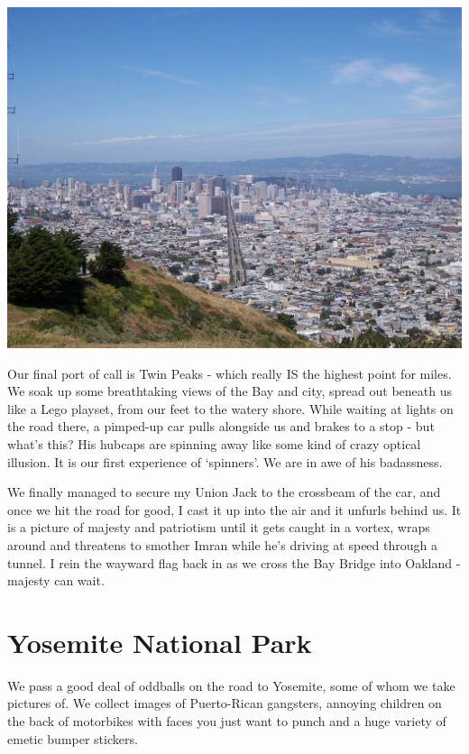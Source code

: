 \documentclass[a5paper,titlepage,11pt]{book}
\begin{document}
\begin{center}\includegraphics[width=\textwidth]{gfx/100_1168}\end{center}

Our final port of call is Twin Peaks - which really IS the highest point for miles. We soak up some breathtaking views of the Bay and city, spread out beneath us like a Lego playset, from our feet to the watery shore.  While waiting at lights on the road there, a pimped-up car pulls alongside us and brakes to a stop - but what's this?  His hubcaps are spinning away like some kind of crazy optical illusion.  It is our first experience of `spinners'.  We are in awe of his badassness.

We finally managed to secure my Union Jack to the crossbeam of the car, and once we hit the road for good, I cast it up into the air and it unfurls behind us.  It is a picture of majesty and patriotism until it gets caught in a vortex, wraps around and threatens to smother Imran while he's driving at speed through a tunnel.  I rein the wayward flag back in as we cross the Bay Bridge into Oakland - majesty can wait.

\section*{Yosemite National Park}
We pass a good deal of oddballs on the road to Yosemite, some of whom we take pictures of.  We collect images of Puerto-Rican gangsters, annoying children on the back of motorbikes with faces you just want to punch and a huge variety of emetic bumper stickers.
\end{document}
